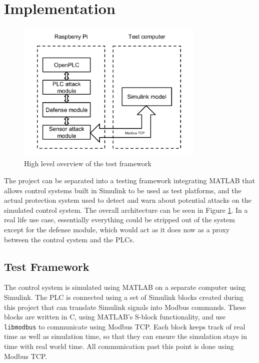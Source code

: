 \documentclass[10pt,twocolumn]{IEEEtran}
\begin{document}
\section{Implementation} \label{sec:impl}
\begin{figure}
  \centering
  \includegraphics[width=0.8\textwidth]{csaw2017architecture.png}
  \caption{High level overview of the test framework}
  \label{fig:arch}
\end{figure}

The project can be separated into a testing framework integrating MATLAB that allows control systems built in Simulink to be used as test platforms, and the actual protection system used to detect and warn about potential attacks on the simulated control system.
The overall architecture can be seen in Figure \ref{fig:arch}.
In a real life use case, essentially everything could be stripped out of the system except for the defense module, which would act as it does now as a proxy between the control system and the PLCs.

\subsection{Test Framework} \label{sec:test}
The control system is simulated using MATLAB on a separate computer using Simulink.
The PLC is connected using a set of Simulink blocks created during this project that can translate Simulink signals into Modbus commands.
These blocks are written in C, using MATLAB's S-block functionality, and use \texttt{libmodbus} to communicate using Modbus TCP.
Each block keeps track of real time as well as simulation time, so that they can ensure the simulation stays in time with real world time.
All communication past this point is done using Modbus TCP.
\end{document}
